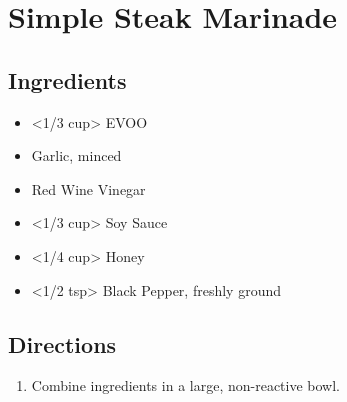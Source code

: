 \section{Simple Steak Marinade}

\subsection{ Ingredients }

\begin{itemize}
  \item <1/3 cup> EVOO
  \item <2 cloves> Garlic, minced
  \item <2 tbs> Red Wine Vinegar
  \item <1/3 cup> Soy Sauce
  \item <1/4 cup> Honey
  \item <1/2 tsp> Black Pepper, freshly ground
\end{itemize}

\subsection{ Directions }

\begin{enumerate}
  \item Combine ingredients in a large, non-reactive bowl. 
\end{enumerate}
